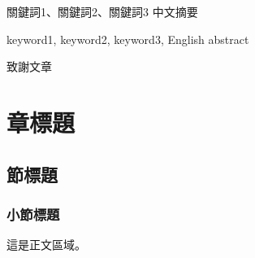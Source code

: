 \documentclass[12pt]{report}
\theoremstyle{plain}
\begin{document}
\makecoverpage

\maketitlepage

\checkresult{} %

\begin{init} %

\begin{abszh}{關鍵詞1、關鍵詞2、關鍵詞3}
中文摘要
\end{abszh}

\begin{absen}{keyword1, keyword2, keyword3,}
English abstract
\end{absen}

\begin{ack}
致謝文章
\end{ack}

\makecontentlists

\end{init}

\chapter{章標題}

\section{節標題}

\subsection{小節標題}

這是正文區域。

\clearpage
{}


\end{document}
